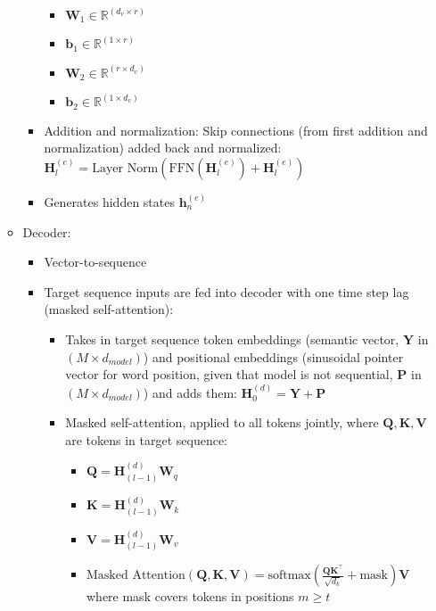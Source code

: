 \begin{itemize}
\begin{itemize}
\begin{itemize}
            \begin{itemize}
                \item $\boldsymbol{W}_1 \in \mathbb{R}^{(d_v \times r)}$
                \item $\boldsymbol{b}_1 \in \mathbb{R}^{(1 \times r)}$
                \item $\boldsymbol{W}_2 \in \mathbb{R}^{(r \times d_v)}$
                \item $\boldsymbol{b}_2 \in \mathbb{R}^{(1 \times d_v)}$
            \end{itemize}
            \item Addition and normalization: Skip connections (from first addition and normalization) added back and normalized: $\boldsymbol{H}_l^{(e)} = \text{Layer Norm}(\text{FFN}(\boldsymbol{H}_l^{(e)}) + \boldsymbol{H}_l^{(e)})$
            \item Generates hidden states $\boldsymbol{h}_n^{(e)}$
        \end{itemize}
        \item Decoder: 
        \begin{itemize}
            \item Vector-to-sequence
            \item Target sequence inputs are fed into decoder with one time step lag (masked self-attention): 
            \begin{itemize}
                \item Takes in target sequence token embeddings (semantic vector, $\boldsymbol{Y}$ in $(M \times d_{model})$) and positional embeddings (sinusoidal pointer vector for word position, given that model is not sequential, $\boldsymbol{P}$ in $(M \times d_{model})$) and adds them:
                $\boldsymbol{H}_0^{(d)} = \boldsymbol{Y} + \boldsymbol{P}$
                \item Masked self-attention, applied to all tokens jointly, where $\boldsymbol{Q,K,V}$ are tokens in target sequence:
                \begin{itemize}
                    \item $\boldsymbol{Q} = \boldsymbol{H}_{(l-1)}^{(d)} \boldsymbol{W}_q$
                    \item $\boldsymbol{K} = \boldsymbol{H}_{(l-1)}^{(d)} \boldsymbol{W}_k$
                    \item $\boldsymbol{V} = \boldsymbol{H}_{(l-1)}^{(d)} \boldsymbol{W}_v$
                    \item $\text{Masked Attention}(\boldsymbol{Q}, \boldsymbol{K}, \boldsymbol{V}) = \text{softmax}\left(\frac{\boldsymbol{Q} \boldsymbol{K}^\top}{\sqrt{d_k}} + \textrm{mask}\right) \boldsymbol{V}$ where mask covers tokens in positions $m \geq t$

\end{itemize}
\end{itemize}
\end{itemize}
\end{itemize}
\end{itemize}
